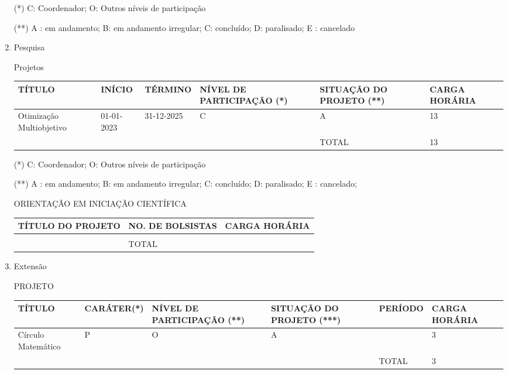 \documentclass[a4paper]{article}
\begin{document}
\begin{enumerate}
		(*)  C: Coordenador; O: Outros níveis de participação

		(**) A : em andamento; B: em andamento irregular; C:  concluído;  D: paralisado; E :  cancelado

		\item Pesquisa
		
		\subitem Projetos

			\begin{tabular}{|p{2.0cm}|p{0.9cm}|p{1.2cm}|p{3cm}|p{4cm}|p{2.4cm}|}
				\hline
			TÍTULO						&  INÍCIO		& TÉRMINO					&	NÍVEL DE PARTICIPAÇÃO (*)	&  SITUAÇÃO DO PROJETO (**)	&CARGA HORÁRIA  		\\ \hline \hline
			Otimização Multiobjetivo	& 01-01-2023  & 31-12-2025					&\hfil		C				   	&\hfil  		A			&\hfil 			13			\\	\hline
			\multicolumn{4}{c|}{}																					& TOTAL   					&\hfil  		13			\\ \cline{5-6}
			\end{tabular}

			(*)  C: Coordenador; O: Outros níveis de participação

			(**) A : em andamento; B: em andamento irregular; C:  concluído;  D: paralisado; E :  cancelado;  

		\subitem ORIENTAÇÃO EM INICIAÇÃO CIENTÍFICA

		\begin{tabular}{|p{5.7cm}|p{5cm}|p{4cm}|}
			\hline
			TÍTULO DO PROJETO			 &  NO. DE BOLSISTAS    &\hfil CARGA HORÁRIA  \\ \hline \hline
										 &  				    & 				\\	\hline
			\multicolumn{1}{c|}{}		 & TOTAL 	  			&  				\\ \cline{2-3}
		\end{tabular}

		\item Extensão

		\subitem PROJETO

			\begin{tabular}{|p{2.0cm}|p{1.9cm}|p{2.2cm}|p{3cm}|p{2cm}|p{2.4cm}|}
				\hline
				TÍTULO		 			&  CARÁTER(*)    & NÍVEL  DE PARTICIPAÇÃO (**)	&	SITUAÇÃO DO  PROJETO (***)	&  PERÍODO	&CARGA HORÁRIA		\\	\hline \hline
				Círculo Matemático	 	& \hfil  P  	 &	\hfil		O				&			\hfil A				& \hfil		&\hfil 3			\\	\hline
				\multicolumn{4}{c|}{}		 				   															& TOTAL 	&\hfil 3			\\	\cline{5-6}
			\end{tabular}


\end{enumerate}
\end{document}

